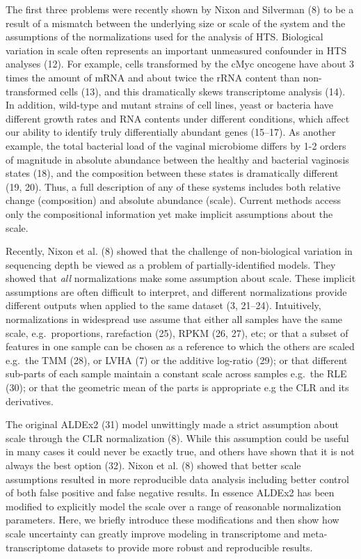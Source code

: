 \documentclass[
]{article}
\begin{document}
The first three problems were recently shown by Nixon and Silverman (8)
to be a result of a mismatch between the underlying size or scale of the
system and the assumptions of the normalizations used for the analysis
of HTS. Biological variation in scale often represents an important
unmeasured confounder in HTS analyses (12). For example, cells
transformed by the cMyc oncogene have about 3 times the amount of mRNA
and about twice the rRNA content than non-transformed cells (13), and
this dramatically skews transcriptome analysis (14). In addition,
wild-type and mutant strains of cell lines, yeast or bacteria have
different growth rates and RNA contents under different conditions,
which affect our ability to identify truly differentially abundant genes
(15--17). As another example, the total bacterial load of the vaginal
microbiome differs by 1-2 orders of magnitude in absolute abundance
between the healthy and bacterial vaginosis states (18), and the
composition between these states is dramatically different (19, 20).
Thus, a full description of any of these systems includes both relative
change (composition) and absolute abundance (scale). Current methods
access only the compositional information yet make implicit assumptions
about the scale.

Recently, Nixon et al. (8) showed that the challenge of non-biological
variation in sequencing depth be viewed as a problem of
partially-identified models. They showed that \emph{all} normalizations
make some assumption about scale. These implicit assumptions are often
difficult to interpret, and different normalizations provide different
outputs when applied to the same dataset (3, 21--24). Intuitively,
normalizations in widespread use assume that either all samples have the
same scale, e.g.~proportions, rarefaction (25), RPKM (26, 27), etc; or
that a subset of features in one sample can be chosen as a reference to
which the others are scaled e.g.~the TMM (28), or LVHA (7) or the
additive log-ratio (29); or that different sub-parts of each sample
maintain a constant scale across samples e.g.~the RLE (30); or that the
geometric mean of the parts is appropriate e.g the CLR and its
derivatives.

The original ALDEx2 (31) model unwittingly made a strict assumption
about scale through the CLR normalization (8). While this assumption
could be useful in many cases it could never be exactly true, and others
have shown that it is not always the best option (32). Nixon et al. (8)
showed that better scale assumptions resulted in more reproducible data
analysis including better control of both false positive and false
negative results. In essence ALDEx2 has been modified to explicitly
model the scale over a range of reasonable normalization parameters.
Here, we briefly introduce these modifications and then show how scale
uncertainty can greatly improve modeling in transcriptome and
meta-transcriptome datasets to provide more robust and reproducible
results.
\end{document}
